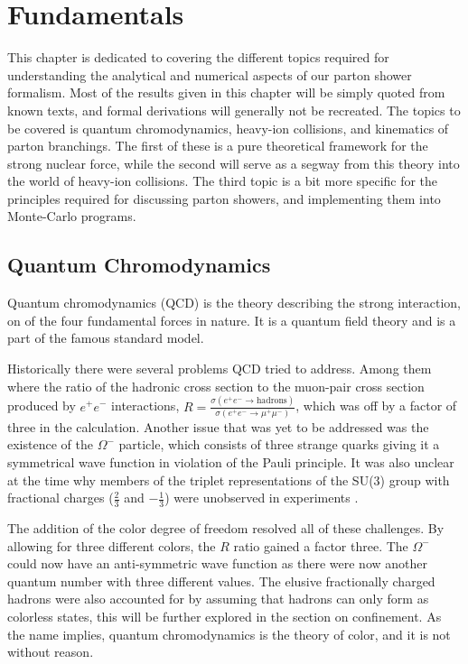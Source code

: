 \documentclass[main.tex]{subfiles}
\begin{document}
    
\chapter{Fundamentals}
This chapter is dedicated to covering the different topics required for understanding the analytical and numerical aspects of our parton shower formalism. Most of the results given in this chapter will be simply quoted from known texts, and formal derivations will generally not be recreated. The topics to be covered is quantum chromodynamics, heavy-ion collisions, and kinematics of parton branchings. The first of these is a pure theoretical framework for the strong nuclear force, while the second will serve as a segway from this theory into the world of heavy-ion collisions. The third topic is a bit more specific for the principles required for discussing parton showers, and implementing them into Monte-Carlo programs.

\section{Quantum Chromodynamics}\label{sec: QCD}
Quantum chromodynamics (QCD) is the theory describing the strong interaction, on of the four fundamental forces in nature. It is a quantum field theory and is a part of the famous standard model.

Historically there were several problems QCD tried to address. Among them where the ratio of the hadronic cross section to the muon-pair cross section produced by \(e^+e^-\)  interactions, \(R = \frac{\sigma(e^+e^-\rightarrow\text{hadrons})}{\sigma(e^+e^- \rightarrow \mu^+\mu^-)}\), which was off by a factor of three in the calculation. Another issue that was yet to be addressed was the existence of the \(\Omega^-\) particle, which consists of three strange quarks giving it a symmetrical wave function in violation of the Pauli principle. It was also unclear at the time why members of the triplet representations of the SU(3) group with fractional charges (\(\frac{2}{3}\) and \(-\frac{1}{3}\)) were unobserved in experiments \cite{CERN_courier_History_of_QCD}. 

The addition of the color degree of freedom resolved all of these challenges. By allowing for three different colors, the \(R\) ratio gained a factor three. The \(\Omega^-\) could now have an anti-symmetric wave function as there were now another quantum number with three different values. The elusive fractionally charged hadrons were also accounted for by assuming that hadrons can only form as colorless states, this will be further explored in the section on confinement. As the name implies, quantum chromodynamics is the theory of color, and it is not without reason.
\end{document}
